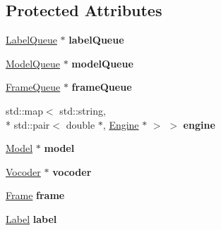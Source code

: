 \subsection*{Protected Attributes}
\begin{DoxyCompactItemize}
\item 
\hypertarget{class_m_a_g_e_1_1_mage_a0bc721d13c832f77794dfbe8446d4ad1}{\hyperlink{class_m_a_g_e_1_1_label_queue}{Label\-Queue} $\ast$ {\bfseries label\-Queue}}\label{class_m_a_g_e_1_1_mage_a0bc721d13c832f77794dfbe8446d4ad1}

\item 
\hypertarget{class_m_a_g_e_1_1_mage_a2a13c60d4174db48bd1b2de2f1f606ed}{\hyperlink{class_m_a_g_e_1_1_model_queue}{Model\-Queue} $\ast$ {\bfseries model\-Queue}}\label{class_m_a_g_e_1_1_mage_a2a13c60d4174db48bd1b2de2f1f606ed}

\item 
\hypertarget{class_m_a_g_e_1_1_mage_a6972a9650e11f8f0e1f28fdb979a8b7c}{\hyperlink{class_m_a_g_e_1_1_frame_queue}{Frame\-Queue} $\ast$ {\bfseries frame\-Queue}}\label{class_m_a_g_e_1_1_mage_a6972a9650e11f8f0e1f28fdb979a8b7c}

\item 
\hypertarget{class_m_a_g_e_1_1_mage_a2cda1c9bd936a2aae08f16048f8a3d8d}{std\-::map$<$ std\-::string, \\*
std\-::pair$<$ double $\ast$, \hyperlink{class_m_a_g_e_1_1_engine}{Engine} $\ast$ $>$ $>$ {\bfseries engine}}\label{class_m_a_g_e_1_1_mage_a2cda1c9bd936a2aae08f16048f8a3d8d}

\item 
\hypertarget{class_m_a_g_e_1_1_mage_ae0026ef68a41dc1764571ff86192e6ce}{\hyperlink{class_m_a_g_e_1_1_model}{Model} $\ast$ {\bfseries model}}\label{class_m_a_g_e_1_1_mage_ae0026ef68a41dc1764571ff86192e6ce}

\item 
\hypertarget{class_m_a_g_e_1_1_mage_aa43e2f78a23a977d9d237c853e0cb39e}{\hyperlink{class_m_a_g_e_1_1_vocoder}{Vocoder} $\ast$ {\bfseries vocoder}}\label{class_m_a_g_e_1_1_mage_aa43e2f78a23a977d9d237c853e0cb39e}

\item 
\hypertarget{class_m_a_g_e_1_1_mage_a060d1f98bb90a6e0a9408bfd154e6bf2}{\hyperlink{struct_m_a_g_e_1_1_frame}{Frame} {\bfseries frame}}\label{class_m_a_g_e_1_1_mage_a060d1f98bb90a6e0a9408bfd154e6bf2}

\item 
\hypertarget{class_m_a_g_e_1_1_mage_aaeb0eeeffb9fb5f84649e40b123ca951}{\hyperlink{class_m_a_g_e_1_1_label}{Label} {\bfseries label}}\label{class_m_a_g_e_1_1_mage_aaeb0eeeffb9fb5f84649e40b123ca951}


\end{DoxyCompactItemize}
